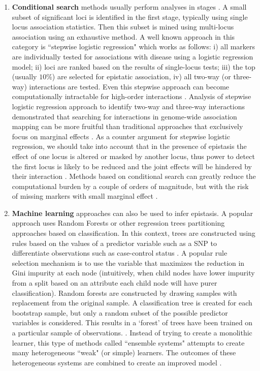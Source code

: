 \begin{enumerate}
	\item \textbf{Conditional search} methods usually perform analyses in stages \cite{li2011detecting}.
A small subset of significant loci is identified in the first stage, typically using single locus association statistics.
Then this subset is mined using multi-locus association using an exhaustive method. 
A well known approach in this category is ``stepwise logistic regression" which works as follows:
i) all markers are individually tested for associations with disease using a logistic regression model;
ii) loci are ranked based on the results of single-locus tests;
iii) the top (usually $10\%$) are selected for epistatic association, 
iv) all two-way (or three-way) interactions are tested. 
Even this stepwise approach can become computationally intractable for high-order interactions \cite{zhang2007bayesian}.
Analysis of stepwise logistic regression approach to identify two-way and three-way interactions demonstrated that searching for interactions in genome-wide association mapping can be more fruitful than traditional approaches that exclusively focus on marginal effects \cite{zhang2007bayesian}.
As a counter argument for stepwise logistic regression, we should take into account that in the presence of epistasis the effect of one locus is altered or masked by another locus, thus power to detect the first locus is likely to be reduced and the joint effects will be hindered by their interaction \cite{cordell2002epistasis}. 
Methods based on conditional search can greatly reduce the computational burden by a couple of orders of magnitude, but with the risk of missing markers with small marginal effect \cite{li2011detecting}.

	\item \textbf{Machine learning} approaches can also be used to infer epistasis.
A popular approach uses Random Forests \cite{li2011detecting} or other regression trees partitioning approaches based on classification.
In this context, trees are constructed using rules based on the values of a predictor variable such as a SNP to differentiate observations such as case-control status \cite{cordell2009detecting}.
A popular rule selection mechanism is to use the variable that maximizes the reduction in Gini impurity \cite{kuhn1995application} at each node (intuitively, when child nodes have lower impurity from a split based on an attribute each child node will have purer classification).
Random forests are constructed by drawing samples with replacement from the original sample. 
A classification tree is created for each bootstrap sample, but only a random subset of the possible predictor variables is considered. 
This results in a `forest' of trees have been trained on a particular sample of observations. \cite{cordell2009detecting}.
Instead of trying to create a monolithic learner, this type of methods called ``ensemble systems" attempts to create many heterogeneous ``weak" (or simple) learners. 
The outcomes of these heterogeneous systems are combined to create an improved model \cite{li2011detecting}.


\end{enumerate}
